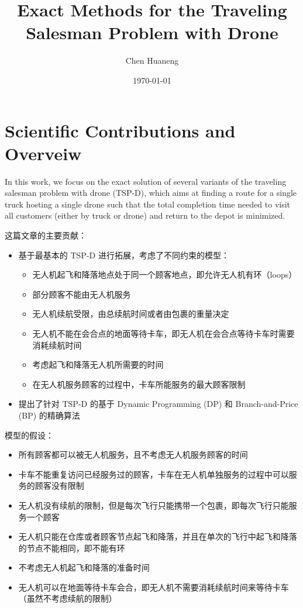 \documentclass[fontset=none]{ctexart}
\title{Exact Methods for the Traveling Salesman Problem with Drone}
\author{Chen Huaneng}
\date{\today}
\begin{document}
\maketitle

\section{Scientific Contributions and Overveiw}
In this work, we focus on the exact solution of several variants of the traveling salesman problem with drone (TSP-D), which aims at finding a route for a single truck hosting a single drone such that the total completion time needed to visit all customers (either by truck or drone) and return to the depot is minimized.

这篇文章\cite{robertiExactMethodsTraveling2021}的主要贡献：
\begin{itemize}
    \item 基于最基本的 TSP-D 进行拓展，考虑了不同约束的模型：
    \begin{itemize}
        \item 无人机起飞和降落地点处于同一个顾客地点，即允许无人机有环（loops）
        \item 部分顾客不能由无人机服务
        \item 无人机续航受限，由总续航时间或者由包裹的重量决定
        \item 无人机不能在会合点的地面等待卡车，即无人机在会合点等待卡车时需要消耗续航时间
        \item 考虑起飞和降落无人机所需要的时间
        \item 在无人机服务顾客的过程中，卡车所能服务的最大顾客限制
    \end{itemize}
    \item 提出了针对 TSP-D 的基于 Dynamic Programming (DP) 和 Branch-and-Price (BP) 的精确算法
\end{itemize}

模型的假设：
\begin{itemize}
    \item 所有顾客都可以被无人机服务，且不考虑无人机服务顾客的时间
    \item 卡车不能重复访问已经服务过的顾客，卡车在无人机单独服务的过程中可以服务的顾客没有限制
    \item 无人机没有续航的限制，但是每次飞行只能携带一个包裹，即每次飞行只能服务一个顾客
    \item 无人机只能在仓库或者顾客节点起飞和降落，并且在单次的飞行中起飞和降落的节点不能相同，即不能有环
    \item 不考虑无人机起飞和降落的准备时间
    \item 无人机可以在地面等待卡车会合，即无人机不需要消耗续航时间来等待卡车（虽然不考虑续航的限制）
\end{itemize}
\end{document}
